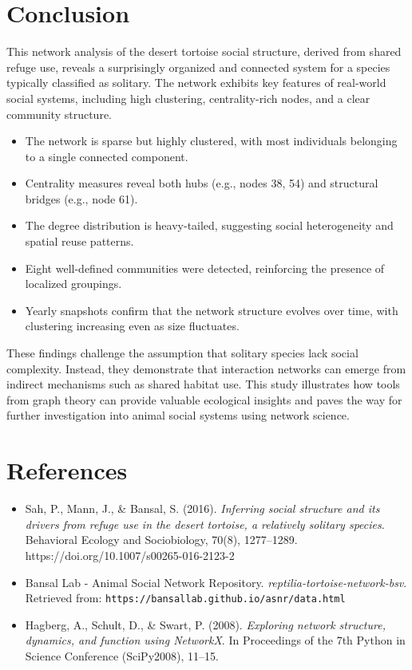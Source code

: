 \documentclass[12pt]{report}
\begin{document}
\chapter*{Conclusion}

This network analysis of the desert tortoise social structure, derived from shared refuge use, reveals a surprisingly organized and connected system for a species typically classified as solitary. The network exhibits key features of real-world social systems, including high clustering, centrality-rich nodes, and a clear community structure.

\begin{itemize}
    \item The network is sparse but highly clustered, with most individuals belonging to a single connected component.
    \item Centrality measures reveal both hubs (e.g., nodes 38, 54) and structural bridges (e.g., node 61).
    \item The degree distribution is heavy-tailed, suggesting social heterogeneity and spatial reuse patterns.
    \item Eight well-defined communities were detected, reinforcing the presence of localized groupings.
    \item Yearly snapshots confirm that the network structure evolves over time, with clustering increasing even as size fluctuates.
\end{itemize}

These findings challenge the assumption that solitary species lack social complexity. Instead, they demonstrate that interaction networks can emerge from indirect mechanisms such as shared habitat use. This study illustrates how tools from graph theory can provide valuable ecological insights and paves the way for further investigation into animal social systems using network science.

\chapter*{References}

\begin{itemize}
    \item Sah, P., Mann, J., \& Bansal, S. (2016). \textit{Inferring social structure and its drivers from refuge use in the desert tortoise, a relatively solitary species}. Behavioral Ecology and Sociobiology, 70(8), 1277–1289. https://doi.org/10.1007/s00265-016-2123-2

    \item Bansal Lab - Animal Social Network Repository. \textit{reptilia-tortoise-network-bsv}. Retrieved from: \texttt{https://bansallab.github.io/asnr/data.html}

    \item Hagberg, A., Schult, D., \& Swart, P. (2008). \textit{Exploring network structure, dynamics, and function using NetworkX}. In Proceedings of the 7th Python in Science Conference (SciPy2008), 11–15.
\end{itemize}
\end{document}
